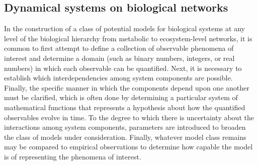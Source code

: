 
\subsection{Dynamical systems on biological networks}\label{suppsec:dynsysbionet}
In the construction of a class of potential models for biological systems at any level of the biological hierarchy from metabolic to ecosystem-level networks, it is common to first attempt to define a collection of observable phenomena of interest and determine a domain (such as binary numbers, integers, or real numbers) in which each observable can be quantified. Next, it is necessary to establish which interdependencies among system components are possible. Finally, the specific manner in which the components depend upon one another must be clarified, which is often done by determining a particular system of mathematical functions that represents a hypothesis about how the quantified observables evolve in time. To the degree to which there is uncertainty about the interactions among system components, parameters are introduced to broaden the class of models under consideration. Finally, whatever model class remains may be compared to empirical observations to determine how capable the model is of representing the phenomena of interest.

